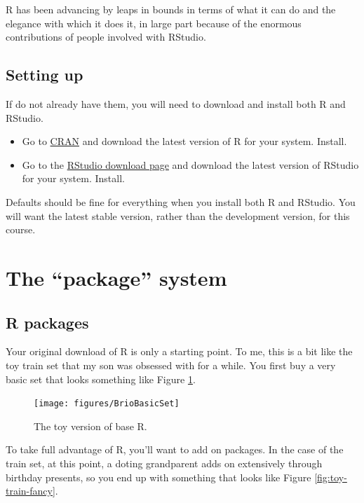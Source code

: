 \documentclass[]{book}
\providecommand{\tightlist}{%
  \setlength{\itemsep}{0pt}\setlength{\parskip}{0pt}}
\begin{document}
R has been advancing by leaps in bounds in terms of what it can do and
the elegance with which it does it, in large part because of the
enormous contributions of people involved with RStudio.

\subsection{Setting up}\label{setting-up}

If do not already have them, you will need to download and install both
R and RStudio.

\begin{itemize}
\tightlist
\item
  Go to \href{https://cran.r-project.org}{CRAN} and download the latest
  version of R for your system. Install.
\item
  Go to the
  \href{https://www.rstudio.com/products/rstudio/download/}{RStudio
  download page} and download the latest version of RStudio for your
  system. Install.
\end{itemize}

Defaults should be fine for everything when you install both R and
RStudio. You will want the latest stable version, rather than the
development version, for this course.

\section{\texorpdfstring{The ``package''
system}{The package system}}\label{the-package-system}

\subsection{R packages}\label{r-packages}

Your original download of R is only a starting point. To me, this is a
bit like the toy train set that my son was obsessed with for a while.
You first buy a very basic set that looks something like Figure
\ref{fig:toy-train-basic}.

\begin{figure}

{\centering \texttt{[image: figures/BrioBasicSet]} 

}

\caption{The toy version of base R.}\label{fig:toy-train-basic}
\end{figure}

To take full advantage of R, you'll want to add on packages. In the case
of the train set, at this point, a doting grandparent adds on
extensively through birthday presents, so you end up with something that
looks like Figure \ref{fig:toy-train-fancy}.
\end{document}
